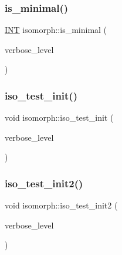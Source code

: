 \mbox{\label{classisomorph_a99d321a02825c08837425be0c555a0c7}} 
\subsubsection{\texorpdfstring{is\+\_\+minimal()}{is\_minimal()}}
{\footnotesize\ttfamily \mbox{\hyperlink{galois_8h_a09fddde158a3a20bd2dcadb609de11dc}{I\+NT}} isomorph\+::is\+\_\+minimal (\begin{DoxyParamCaption}\item[{\mbox{\hyperlink{galois_8h_a09fddde158a3a20bd2dcadb609de11dc}{I\+NT}}}]{verbose\+\_\+level }\end{DoxyParamCaption})}

\mbox{\label{classisomorph_a71d125f4cc34ac9a2160e565021802f8}} 
\subsubsection{\texorpdfstring{iso\+\_\+test\+\_\+init()}{iso\_test\_init()}}
{\footnotesize\ttfamily void isomorph\+::iso\+\_\+test\+\_\+init (\begin{DoxyParamCaption}\item[{\mbox{\hyperlink{galois_8h_a09fddde158a3a20bd2dcadb609de11dc}{I\+NT}}}]{verbose\+\_\+level }\end{DoxyParamCaption})}

\mbox{\label{classisomorph_a5aa54ad741dc6c43e688f6c66dae798d}} 
\subsubsection{\texorpdfstring{iso\+\_\+test\+\_\+init2()}{iso\_test\_init2()}}
{\footnotesize\ttfamily void isomorph\+::iso\+\_\+test\+\_\+init2 (\begin{DoxyParamCaption}\item[{\mbox{\hyperlink{galois_8h_a09fddde158a3a20bd2dcadb609de11dc}{I\+NT}}}]{verbose\+\_\+level }\end{DoxyParamCaption})}

